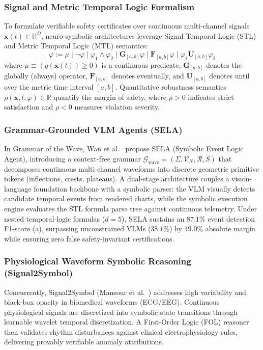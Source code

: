 \subsubsection{Signal and Metric Temporal Logic Formalism}
To formulate verifiable safety certificates over continuous multi-channel signals $\mathbf{x}(t) \in \mathbb{R}^D$, neuro-symbolic architectures leverage Signal Temporal Logic (STL) and Metric Temporal Logic (MTL) semantics:
\begin{equation}
    \varphi := \mu \mid \neg \varphi \mid \varphi_1 \wedge \varphi_2 \mid \mathbf{G}_{[a, b]} \varphi \mid \mathbf{F}_{[a, b]} \varphi \mid \varphi_1 \mathbf{U}_{[a, b]} \varphi_2
\end{equation}
where $\mu \equiv (g(\mathbf{x}(t)) \ge 0)$ is a continuous predicate, $\mathbf{G}_{[a, b]}$ denotes the globally (always) operator, $\mathbf{F}_{[a, b]}$ denotes eventually, and $\mathbf{U}_{[a, b]}$ denotes until over the metric time interval $[a, b]$. Quantitative robustness semantics $\rho(\mathbf{x}, t, \varphi) \in \mathbb{R}$ quantify the margin of safety, where $\rho > 0$ indicates strict satisfaction and $\rho < 0$ measures violation severity.

\subsubsection{Grammar-Grounded VLM Agents (SELA)}
In Grammar of the Wave, Wan et al.~\cite{Wan2026GrammarWave} propose SELA (Symbolic Event Logic Agent), introducing a context-free grammar $\mathcal{G}_{\text{wave}} = (\Sigma, \mathcal{V}_N, \mathcal{R}, S)$ that decomposes continuous multi-channel waveforms into discrete geometric primitive tokens (inflections, crests, plateaus). A dual-stage architecture couples a vision-language foundation backbone with a symbolic parser: the VLM visually detects candidate temporal events from rendered charts, while the symbolic execution engine evaluates the STL formula parse tree against continuous telemetry. Under nested temporal-logic formulas ($d=5$), SELA sustains an $87.1\%$ event detection F1-score (a), surpassing unconstrained VLMs ($38.1\%$) by $49.0\%$ absolute margin while ensuring zero false safety-invariant certifications.

\subsubsection{Physiological Waveform Symbolic Reasoning (Signal2Symbol)}
Concurrently, Signal2Symbol (Mansour et al.~\cite{Mansour2026Signal2Symbol}) addresses high variability and black-box opacity in biomedical waveforms (ECG/EEG). Continuous physiological signals are discretized into symbolic state transitions through learnable wavelet temporal discretization. A First-Order Logic (FOL) reasoner then validates rhythm disturbances against clinical electrophysiology rules, delivering provably verifiable anomaly attributions.

